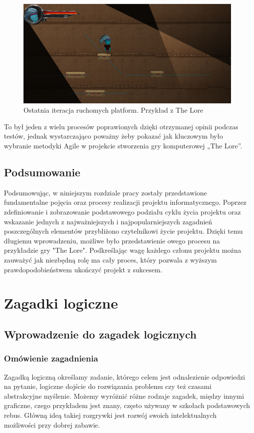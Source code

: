 \documentclass[oneside,polski,logo]{amuthesis}
\begin{document}
\begin{figure}[h]
	\centering
	\includegraphics[width=12cm]{images/hyps/platfAfter.png}
	\caption{Ostatnia iteracja ruchomych platform. Przykład z The Lore}
\end{figure}

To był jeden z wielu procesów poprawionych dzięki otrzymanej opinii podczas testów, jednak wystarczająco poważny żeby pokazać jak kluczowym było wybranie metodyki Agile w projekcie stworzenia gry komputerowej „The Lore”.\\

\section{Podsumowanie}
Podsumowując, w niniejszym rozdziale pracy zostały przedstawione fundamentalne pojęcia oraz procesy realizacji projektu informatycznego. Poprzez zdefiniowanie i zobrazowanie podstawowego podziału cyklu życia projektu oraz wskazanie jednych z najważniejszych i najpopularniejszych zagadnień poszczególnych elementów przybliżono czytelnikowi życie projektu. Dzięki temu długiemu wprowadzeniu, możliwe było przedstawienie owego procesu na przykładzie gry "The Lore". Podkreślając wagę każdego członu projektu można zauważyć jak niezbędną rolę ma cały proces, który pozwala z wyższym prawdopodobieństwem ukończyć projekt z sukcesem. 



\chapter{Zagadki logiczne}
\section{Wprowadzenie do zagadek logicznych}
\subsection{Omówienie zagadnienia}
Zagadką logiczną określamy zadanie, którego celem jest odnalezienie odpowiedzi na pytanie, logiczne dojście do rozwiązania problemu czy też czasami abstrakcyjne myślenie. Możemy wyróżnić różne rodzaje zagadek, między innymi graficzne, czego przykładem jest znany, często używany w szkołach podstawowych rebus. Główną ideą takiej rozgrywki jest rozwój swoich intelektualnych możliwości przy dobrej zabawie. \cite{zagadka_logiczna}
\end{document}
